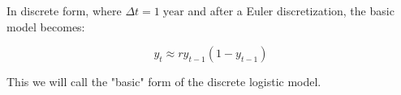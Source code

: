 \documentclass[letterpaper,portrait,11pt]{scrartcl}
\numberwithin{equation}{section}		%
\numberwithin{figure}{section}		%
\numberwithin{table}{section}				%
\begin{document}
\begin{appendices}
In discrete form, where $\Delta t = 1 \; \text{year}$ and after a Euler discretization, the basic model becomes:

\begin{equation} 
\label{eqLogisticDiscrete:appendix}
y_t  \approx r y_{t-1} (1 - y_{t-1} )
\end{equation}

This we will call the "basic" form of the discrete logistic model.


\end{appendices}
\end{document}
